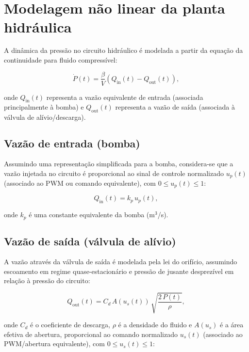\section{Modelagem não linear da planta hidráulica}
\label{sec:controle-modelo-nao-linear}

A dinâmica da pressão no circuito hidráulico é modelada a partir da equação da continuidade para fluido compressível:

\begin{equation}
\dot{P}(t) = \frac{\beta}{V}\left(Q_{\text{in}}(t) - Q_{\text{out}}(t)\right),
\label{eq:pressao_continuidade}
\end{equation}

onde $Q_{\text{in}}(t)$ representa a vazão equivalente de entrada (associada principalmente à bomba) e $Q_{\text{out}}(t)$ representa a vazão de saída (associada à válvula de alívio/descarga).

\subsection{Vazão de entrada (bomba)}
\label{subsec:controle-vazao-bomba}

Assumindo uma representação simplificada para a bomba, considera-se que a vazão injetada no circuito é proporcional ao sinal de controle normalizado $u_p(t)$ (associado ao \gls{PWM} ou comando equivalente), com $0 \le u_p(t) \le 1$:

\begin{equation}
Q_{\text{in}}(t) = k_p \, u_p(t),
\label{eq:vazao_bomba}
\end{equation}

onde $k_p$ é uma constante equivalente da bomba (m$^3$/s).

\subsection{Vazão de saída (válvula de alívio)}
\label{subsec:controle-vazao-valvula}

A vazão através da válvula de saída é modelada pela lei do orifício, assumindo escoamento em regime quase-estacionário e pressão de jusante desprezível em relação à pressão do circuito:

\begin{equation}
Q_{\text{out}}(t) = C_d \, A(u_s(t)) \, \sqrt{\frac{2\,P(t)}{\rho}},
\label{eq:vazao_saida_orificio}
\end{equation}

onde $C_d$ é o coeficiente de descarga, $\rho$ é a densidade do fluido e $A(u_s)$ é a área efetiva de abertura, proporcional ao comando normalizado $u_s(t)$ (associado ao PWM/abertura equivalente), com $0 \le u_s(t) \le 1$:

